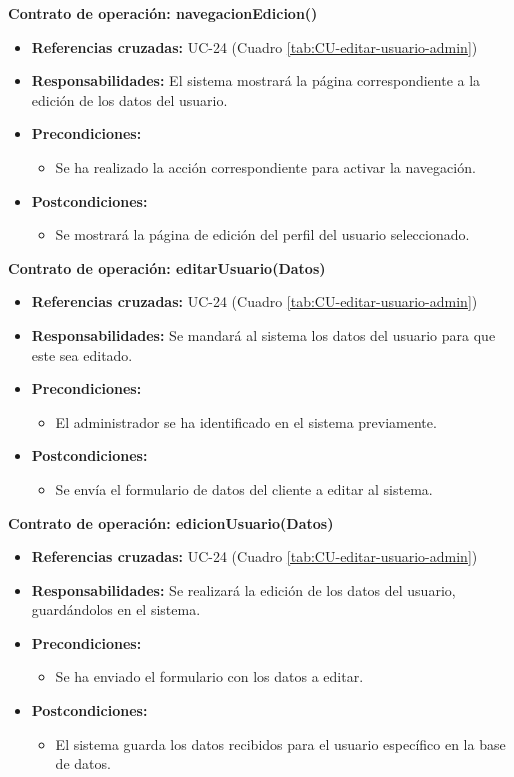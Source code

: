 \textbf{Contrato de operación: navegacionEdicion()}
\begin{itemize}
\item \textbf{Referencias cruzadas:} UC-24 (Cuadro \ref{tab:CU-editar-usuario-admin})
\item \textbf{Responsabilidades:} El sistema mostrará la página correspondiente a la edición de los datos del usuario.
\item \textbf{Precondiciones:} 
 \begin{itemize}
\item Se ha realizado la acción correspondiente para activar la navegación.
\end {itemize}
\item \textbf{Postcondiciones:} 
 \begin{itemize}
\item Se mostrará la página de edición del perfil del usuario seleccionado.
\end {itemize}
\end {itemize}

\textbf{Contrato de operación: editarUsuario(Datos)}
\begin{itemize}
\item \textbf{Referencias cruzadas:} UC-24 (Cuadro \ref{tab:CU-editar-usuario-admin})
\item \textbf{Responsabilidades:} Se mandará al sistema los datos del usuario para que este sea editado.
\item \textbf{Precondiciones:} 
 \begin{itemize}
\item El administrador se ha identificado en el sistema previamente.
\end {itemize}
\item \textbf{Postcondiciones:} 
 \begin{itemize}
\item Se envía el formulario de datos del cliente a editar al sistema.
\end {itemize}
\end {itemize}

\textbf{Contrato de operación: edicionUsuario(Datos)}
\begin{itemize}
\item \textbf{Referencias cruzadas:} UC-24 (Cuadro \ref{tab:CU-editar-usuario-admin})
\item \textbf{Responsabilidades:} Se realizará la edición de los datos del usuario, guardándolos en el sistema.
\item \textbf{Precondiciones:} 
 \begin{itemize}
\item Se ha enviado el formulario con los datos a editar.
\end {itemize}
\item \textbf{Postcondiciones:} 
 \begin{itemize}
\item El sistema guarda los datos recibidos para el usuario específico en la base de datos.
\end {itemize}
\end {itemize}

